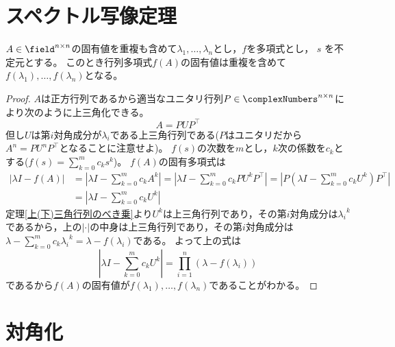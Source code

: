     \section{スペクトル写像定理}
        \begin{shadebox}
            $A\in\field^{n\times n}$の固有値を重複も含めて$\lambda_1,\dotsc,\lambda_n$とし，$f$を多項式とし， $s$ を不定元とする。
            このとき行列多項式$f(A)$の固有値は重複を含めて$f(\lambda_1),\dotsc,f(\lambda_n)$となる。
        \end{shadebox}
        \begin{proof}
            \quad\par
            $A$は正方行列であるから適当なユニタリ行列$P\in\complexNumbers^{n\times n}$により次のように上三角化できる。
            \[A = PUP^\top\]
            但し$U$は第$i$対角成分が$\lambda_i$である上三角行列である($P$はユニタリだから$A^n = PU^nP^\top$となることに注意せよ)。
            $f(s)$の次数を$m$とし，$k$次の係数を$c_k$とする($f(s) = \sum_{k=0}^{m}c_{k}s^k$)。
            $f(A)$の固有多項式は
            \begin{align*}
                \left|\lambda I - f(A)\right| &= \left|\lambda I - \sum_{k=0}^{m}c_{k}A^k\right| = \left|\lambda I - \sum_{k=0}^{m}c_{k}PU^kP^\top\right| = \left|P\left(\lambda I - \sum_{k=0}^{m}c_{k}U^k\right)P^\top\right| \\
                &= \left|\lambda I - \sum_{k=0}^{m}c_{k}U^k\right|
            \end{align*}
            定理\ref{上(下)三角行列のべき乗}より$U^k$は上三角行列であり，その第$i$対角成分は${\lambda_i}^k$であるから，上の$|\cdot|$の中身は上三角行列であり，その第$i$対角成分は$\lambda - \sum_{k=0}^{m}c_{k}{\lambda_i}^k = \lambda - f(\lambda_i)$である。
            よって上の式は
            \[\left|\lambda I - \sum_{k=0}^{m}c_{k}U^k\right| = \prod_{i=1}^{n}{(\lambda - f(\lambda_i))}\]
            であるから$f(A)$の固有値が$f(\lambda_1),\dotsc,f(\lambda_n)$であることがわかる。
        \end{proof}
    \section{対角化}
